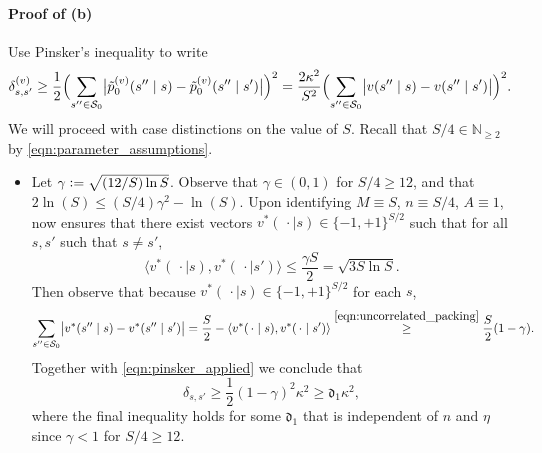 \documentclass[11pt]{article}
\newcommand{\eqdef}{\vcentcolon=}
\newcommand{\mf}[1]{\mathfrak{#1}}
\newcommand{\mcS}{\mathcal{S}}
\newcommand{\mbbN}{\mathbb{N}}
\theoremstyle{definition}
\theoremstyle{definition}
\begin{document}
\paragraph{Proof of (b)}
Use Pinsker's inequality to write
\begin{equation}
	\delta^{(v)}_{s,s'}
	\geq
	\frac{1}{2}
	\Bigl(
	\sum_{s''\in\mcS_0}
	\bigl|
	\tilde{p}^{(v)}_0(s'' \mid s)-\tilde{p}^{(v)}_0(s'' \mid s')
	\bigr|
	\Bigr)^2
	=
	\frac{2\kappa^2}{S^2}
	\Bigl(
	\sum_{s''\in\mcS_0}
	\bigl|
	v(s'' \mid s)-v(s'' \mid s')
	\bigr|
	\Bigr)^2
	.
	\label{eqn:pinsker_applied}
\end{equation}
We will proceed with case distinctions on the value of $S$.
Recall that $S/4 \in \mbbN_{\geq 2}$ by \eqref{eqn:parameter_assumptions}.

\begin{itemize}
	\item[Case $\frac{S}{4}\geq 12$.]
	      Let $\gamma\eqdef \sqrt{(12/S)\ln S}$.
		  Observe that $\gamma\in (0,1)$ for $S/4\geq 12$, and that $2\ln(S)\leq (S/4)\gamma^2-\ln(S)$.
		  Upon identifying $M \equiv S$, $n\equiv S/4$, $A \equiv 1$, \cite[Lemma~D.6]{jin2020reward} now ensures that there exist vectors $v^*( \,\cdot\mid  s )\in\{-1,+1\}^{S/2}$ such that for all $s,s'$ such that $s\neq s'$,
	      \begin{equation}
		      \label{eqn:uncorrelated_packing}
		      \bigl\langle
		      v^*( \,\cdot\mid  s ),v^*(\,\cdot\mid  s')
		      \bigr\rangle
		      \leq
		      \frac{\gamma S}{2}
			  =
		      \sqrt{3S \ln S}
		      .
	      \end{equation}
	      Then observe that because $v^*( \,\cdot\mid  s )\in\{-1,+1\}^{S/2}$ for each $s$,
	      \begin{equation}
		      \sum_{s''\in\mcS_0}
		      \bigl|v^*(s'' \mid s)-v^*(s'' \mid s')\bigr|
		      =
		      \frac{S}{2}
		      -
		      \langle v^*( \,\cdot\mid  s ), v^*(\,\cdot\mid  s')\rangle
		      \overset{\eqref{eqn:uncorrelated_packing}}{\geq}
		      \frac{S}{2}
		      (1-\gamma).
	      \end{equation}
	      Together with \eqref{eqn:pinsker_applied} we conclude that
	      \begin{equation}
		      \label{eqn:lower_bound_on_KL_divergence}
		      \delta_{s,s'}
		      \geq
		      \frac{1}{2}
		      (1-\gamma)^2\kappa^2
		      \geq
		      \mf{d}_1
		      \kappa^2
		      ,
	      \end{equation}
	      where the final inequality holds for some $\mf{d}_1$ that is independent of $n$ and $\eta$ since $\gamma<1$ for $S/4\geq 12$.


\end{itemize}
\end{document}
